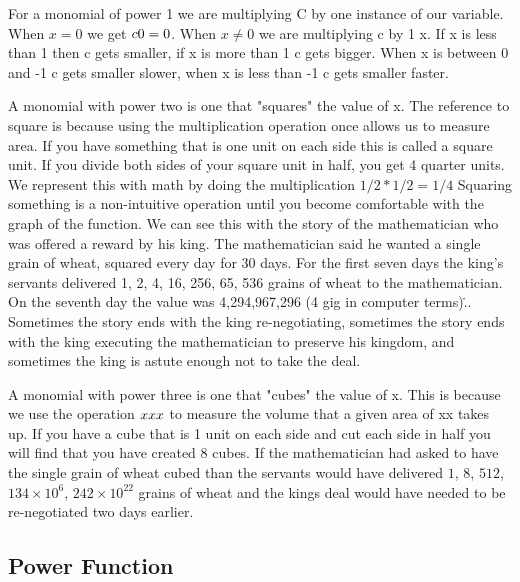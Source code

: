 For a monomial of power 1 we are multiplying C by one instance of our variable. When $x=0$
we get $c\*0=0$. When $x \ne 0$ we are multiplying c by 1 x. If x is less than 1 then c
gets smaller, if x is more than 1 c gets bigger. When x is between 0 and -1 c gets smaller
slower, when x is less than -1 c gets smaller faster.



A monomial with power two is one that "squares" the value of x. The reference to square is
because using the multiplication operation once allows us to measure area. If you have
something that is one unit on each side this is called a square unit. If you divide both
sides of your square unit in half, you get 4 quarter units. We represent this with math by
doing the multiplication $1/2 * 1/2 = 1/4$ Squaring something is a non-intuitive operation
until you become comfortable with the graph of the function. We can see this with the
story of the mathematician who was offered a reward by his king. The mathematician said he
wanted a single grain of wheat, squared every day for 30 days. For the first seven days
the king's servants delivered 1, 2, 4, 16, 256, 65, 536 grains of wheat to the
mathematician. On the seventh day the value was 4,294,967,296 (4 gig in computer
terms)\... Sometimes the story ends with the king re-negotiating, sometimes the story ends
with the king executing the mathematician to preserve his kingdom, and sometimes the king
is astute enough not to take the deal.



A monomial with power three is one that "cubes" the value of x. This is because we use the
operation $x\*x\*x$ to measure the volume that a given area of x\*x takes up. If you have
a cube that is 1 unit on each side and cut each side in half you will find that you have
created 8 cubes. If the mathematician had asked to have the single grain of wheat cubed
than the servants would have delivered $1$, $8$, $512$, $134 \times 10^6$, $242 \times
10^{22}$ grains of wheat and the kings deal would have needed to be re-negotiated two days
earlier.




\subsection{Power Function}
\label{sss:powe-5c2b}




